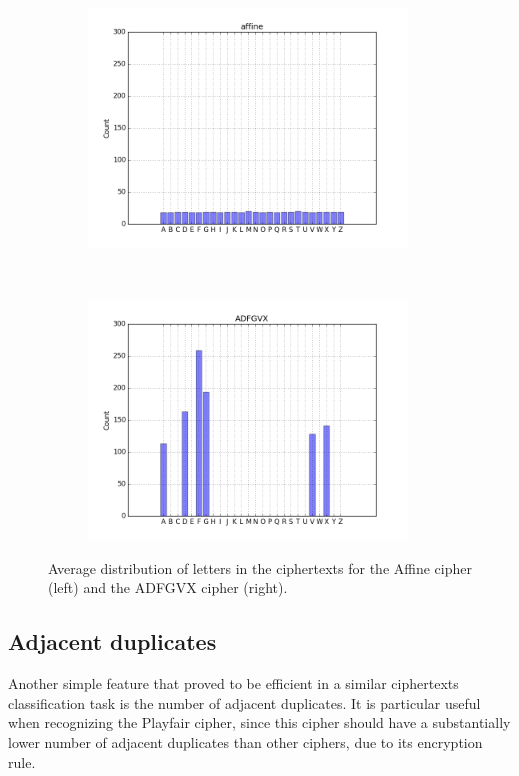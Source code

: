 \documentclass[a4paper]{article}
\begin{document}
\begin{figure}[H]
    \centering
    \begin{subfigure}[h]{0.5\textwidth}
    		\centering
        \includegraphics[height=2.5in]{img/affine_dist.png}
    \end{subfigure}%
    ~
    \begin{subfigure}[h]{0.5\textwidth}
	    \centering
        \includegraphics[height=2.5in]{img/adfgvx_dist.png}
    \end{subfigure}
    \caption{Average distribution of letters in the ciphertexts for the Affine cipher (left) and the ADFGVX cipher (right).}
    \label{fig:letter_dist}
\end{figure}

\subsection{Adjacent duplicates}
Another simple feature that proved to be efficient in a similar ciphertexts classification task \cite{sivagurunathan2010classification} is the number of adjacent duplicates. It is particular useful when recognizing the Playfair cipher, since this cipher should have a substantially lower number of adjacent duplicates than other ciphers, due to its encryption rule.
\end{document}
